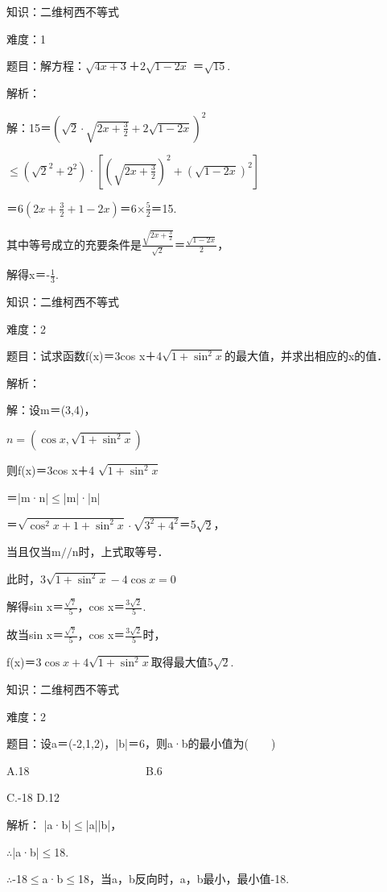 \documentclass{article} %
\begin{document}
 

 知识：二维柯西不等式

 难度：1

 题目：解方程：$\sqrt{4x+3}$＋$2\sqrt{1-2x}$ ＝$\sqrt{15}$.

 解析：

 解：15＝$(\sqrt{2}\cdot\sqrt{2x+\frac{3}{2}}+2\sqrt{1-2x})^2$

$\mathrm{\le}$$(\sqrt{2}^2+2^2)$·$[(\sqrt{2x+\frac{3}{2}})^2+(\sqrt{1-2x})^2]$

＝$6(2x+\frac{3}{2}+1-2x)$＝6$\mathrm{\times}\frac{5}{2}$＝15.

其中等号成立的充要条件是$\frac{\sqrt{2x+\frac{3}{2}}}{\sqrt{2}}$＝$\frac{\sqrt{1-2x}}{2}$，

解得x＝-$\frac{1}{3}$.

 

 知识：二维柯西不等式

 难度：2

 题目：试求函数f(x)＝3cos x＋4$\sqrt{1+\sin^2 x}$的最大值，并求出相应的x的值．

 解析：

 解：设m＝(3,4)，

$n=(\cos x, \sqrt{1+\sin^2x})$

则f(x)＝3cos x＋4 $\sqrt{1+\sin^2x}$

＝|m·n|$\mathrm{\le}$|m|·|n|

＝$\sqrt{\cos^2 x+1+\sin^2 x}\cdot \sqrt{3^2+4^2}$＝5$\sqrt{2}$，

当且仅当m$//$n时，上式取等号．

此时，$3\sqrt{1+\sin^2 x}-4\cos x=0$

解得sin x＝$\frac{\sqrt{7}}{5}$，cos x＝$\frac{3\sqrt{2}}{5}$.

故当sin x＝$\frac{\sqrt{7}}{5}$，cos x＝$\frac{3\sqrt{2}}{5}$时，

f(x)＝$3\cos x+4\sqrt{1+\sin^2 x}$取得最大值5$\sqrt{2}$.

 

 知识：二维柯西不等式

 难度：2

 题目：设a＝(-2,1,2)，|b|＝6，则a·b的最小值为(　　)

A.18　　　　　　　　　　  B.6  

C.-18  D.12

 解析： |a·b|$\mathrm{\le}$|a||b|，

$\mathrm{\therefore}$|a·b|$\mathrm{\le}$18.

$\mathrm{\therefore}$-18$\mathrm{\le}$a·b$\mathrm{\le}$18，当a，b反向时，a，b最小，最小值-18.
\end{document}
